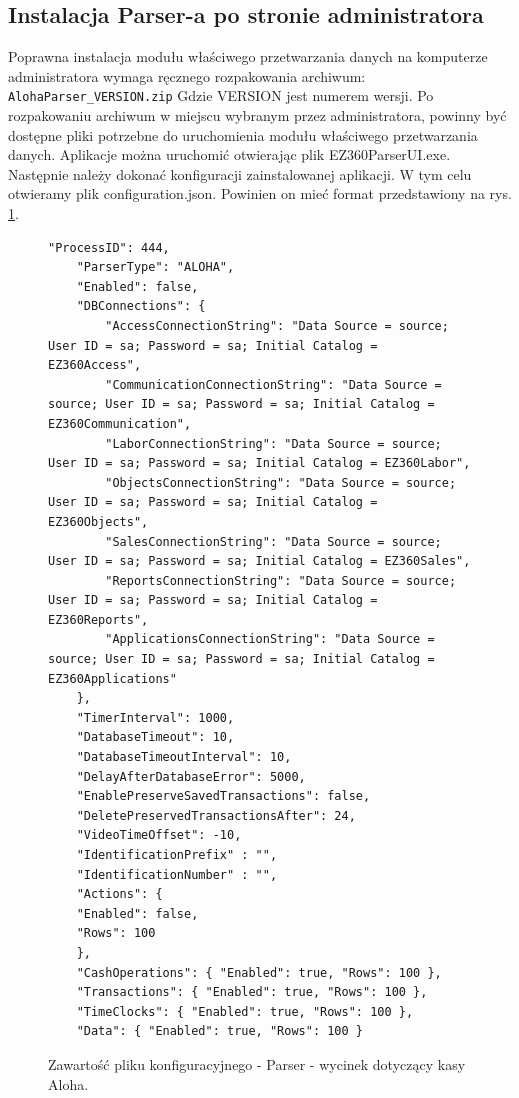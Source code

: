 \documentclass[a4paper]{book}
\begin{document}
\subsection{Instalacja Parser-a po stronie administratora}
Poprawna instalacja modułu właściwego przetwarzania danych na komputerze administratora wymaga ręcznego rozpakowania archiwum:
\newline
 \texttt{AlohaParser\_VERSION.zip}
 \newline
 Gdzie VERSION jest numerem wersji. Po rozpakowaniu archiwum w miejscu wybranym przez administratora, powinny być dostępne pliki potrzebne do uruchomienia modułu właściwego przetwarzania danych.
Aplikacje można uruchomić otwierając plik EZ360ParserUI.exe.
Następnie należy dokonać konfiguracji zainstalowanej aplikacji. W tym celu otwieramy plik configuration.json. Powinien on mieć format przedstawiony na rys. \ref{lst:przykladowyPlikKonfiguracyjnyParser}.
\begin{figure}[t]
	\begin{lstlisting}[frame=single, breaklines=true]
	"ProcessID": 444,
	"ParserType": "ALOHA",
	"Enabled": false,
	"DBConnections": {
		"AccessConnectionString": "Data Source = source; User ID = sa; Password = sa; Initial Catalog = EZ360Access",
		"CommunicationConnectionString": "Data Source = source; User ID = sa; Password = sa; Initial Catalog = EZ360Communication",
		"LaborConnectionString": "Data Source = source; User ID = sa; Password = sa; Initial Catalog = EZ360Labor",
		"ObjectsConnectionString": "Data Source = source; User ID = sa; Password = sa; Initial Catalog = EZ360Objects",
		"SalesConnectionString": "Data Source = source; User ID = sa; Password = sa; Initial Catalog = EZ360Sales",
		"ReportsConnectionString": "Data Source = source; User ID = sa; Password = sa; Initial Catalog = EZ360Reports",      
		"ApplicationsConnectionString": "Data Source = source; User ID = sa; Password = sa; Initial Catalog = EZ360Applications"
	},
	"TimerInterval": 1000,
	"DatabaseTimeout": 10,
	"DatabaseTimeoutInterval": 10,
	"DelayAfterDatabaseError": 5000,
	"EnablePreserveSavedTransactions": false,
	"DeletePreservedTransactionsAfter": 24,
	"VideoTimeOffset": -10,
	"IdentificationPrefix" : "",
	"IdentificationNumber" : "",
	"Actions": {
	"Enabled": false,
	"Rows": 100
	},
	"CashOperations": { "Enabled": true, "Rows": 100 },
	"Transactions": { "Enabled": true, "Rows": 100 },
	"TimeClocks": { "Enabled": true, "Rows": 100 },
	"Data": { "Enabled": true, "Rows": 100 }
	\end{lstlisting}
	\caption{Zawartość pliku konfiguracyjnego - Parser - wycinek dotyczący kasy Aloha.}
	\label{lst:przykladowyPlikKonfiguracyjnyParser}
\end{figure}
\end{document}
